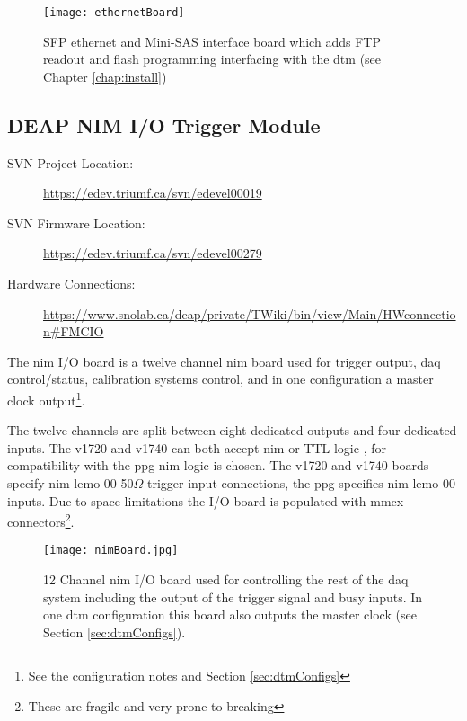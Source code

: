 \begin{figure}
\centering
\texttt{[image: ethernetBoard]}
\caption{SFP ethernet and Mini-SAS interface board which adds FTP readout and flash programming interfacing with the \gls{dtm} (see Chapter \ref{chap:install})}
\label{Fig:ethernetBoard}
\end{figure}


\subsection{DEAP NIM I/O Trigger Module}
\label{sec:nimBoard}
\begin{description}
\item[SVN Project Location: ]\url{https://edev.triumf.ca/svn/edevel00019}
\item[SVN Firmware Location: ]\url{https://edev.triumf.ca/svn/edevel00279}
\item[Hardware Connections: ]\url{https://www.snolab.ca/deap/private/TWiki/bin/view/Main/HWconnection#FMCIO}
\end{description}
The \gls{nim} I/O board is a twelve channel \gls{nim} board used for trigger output, \gls{daq} control/status, calibration systems control, and in one configuration a master clock output\footnote{See the configuration notes and Section \ref{sec:dtmConfigs}}. 

The twelve channels are split between eight dedicated outputs and four dedicated inputs.
The \gls{v1720} and \gls{v1740} can both accept \gls{nim} or TTL logic \cite{v1720UM}\cite{v1740UM}, for compatibility with the \gls{ppg}\cite{ppg} \gls{nim} logic is chosen.
The \gls{v1720} and \gls{v1740} boards specify \gls{nim} lemo-00 50$\Omega$ trigger input connections, the \gls{ppg}\cite{ppg} specifies \gls{nim} lemo-00 inputs.
Due to space limitations the I/O board is populated with mmcx connectors\footnote{These are fragile and very prone to breaking}.

\begin{figure}
\centering
\texttt{[image: nimBoard.jpg]}
\caption{12 Channel \gls{nim} I/O board used for controlling the rest of the \gls{daq} system including the output of the trigger signal and busy inputs. In one \gls{dtm} configuration this board also outputs the master clock (see Section \ref{sec:dtmConfigs}).}
\label{Fig:nimBoard}
\end{figure}

